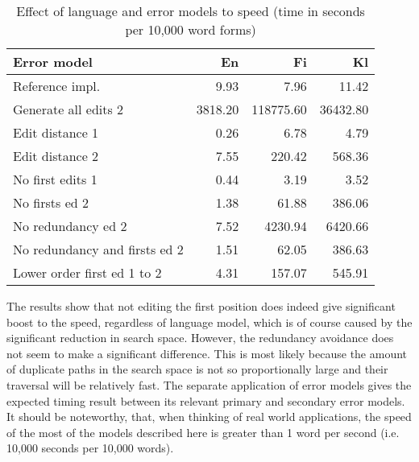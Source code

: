 \documentclass[11pt]{article}
\begin{document}
\begin{table}[h]
\begin{center}
\begin{scriptsize}
\begin{tabular}{|l|rrr|}
\hline
\bf Error model & \bf En & \bf Fi & \bf Kl \\ 
\hline
Reference impl. &
9.93&7.96&11.42
\\
Generate all edits 2 & 
3818.20&118775.60&36432.80
\\
\hline
Edit distance 1 &
0.26&6.78&4.79
\\
Edit distance 2 &
7.55&220.42&568.36
\\
No first edits 1 & 
0.44&3.19&3.52
\\
No firsts ed 2 &
1.38&61.88&386.06
\\
No redundancy ed 2 &
7.52&4230.94&6420.66
\\
No redundancy and firsts ed 2 &
1.51&62.05&386.63
\\
Lower order first ed 1 to 2 &
4.31&157.07&545.91
\\
\hline
\end{tabular}
\end{scriptsize}
\end{center}
\caption{\label{table:error-model-vs-language-speed} Effect of language and 
error models to speed (time in seconds per 10,000 word forms)}
\end{table}

The results show that not editing the first position does indeed give
significant boost to the speed, regardless of language model, which is of course
caused by the significant reduction in search space. However, the
redundancy avoidance does not seem to make a significant difference. This is most
likely because the amount of duplicate paths in the search space is not so
proportionally large and their traversal will be relatively fast. The separate
application of error models gives the expected timing result between its
relevant primary and secondary error models. It should be noteworthy, that, when
thinking of real world applications, the speed of the most of the models
described here is greater than 1 word per second (i.e. 10,000 seconds per 10,000
words).
\end{document}

